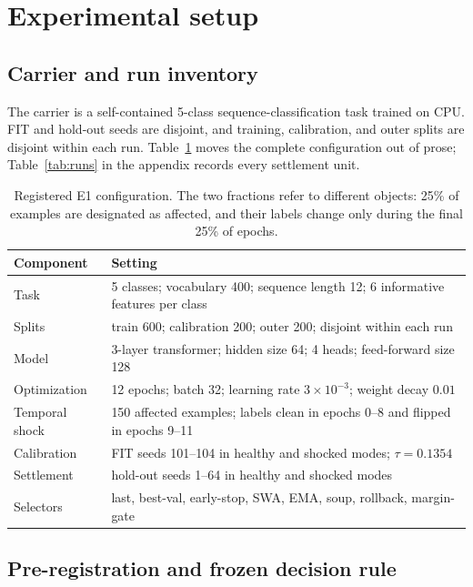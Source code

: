 \documentclass{article} %
\theoremstyle{remark}
\begin{document}
\section{Experimental setup}
\label{sec:exp}

\subsection{Carrier and run inventory}
\label{sec:configuration}

The carrier is a self-contained 5-class sequence-classification task trained on CPU. FIT and
hold-out seeds are disjoint, and training, calibration, and outer splits are disjoint within each
run. Table~\ref{tab:config} moves the complete configuration out of prose; Table~\ref{tab:runs} in
the appendix records every settlement unit.

\begin{table}[t]
\centering
\caption{Registered E1 configuration. The two fractions refer to different objects: 25\% of
examples are designated as affected, and their labels change only during the final 25\% of epochs.}
\label{tab:config}
\small
\begin{tabularx}{\linewidth}{@{}lX@{}}
\toprule
\textbf{Component} & \textbf{Setting} \\
\midrule
Task & 5 classes; vocabulary 400; sequence length 12; 6 informative features per class \\
Splits & train 600; calibration 200; outer 200; disjoint within each run \\
Model & 3-layer transformer; hidden size 64; 4 heads; feed-forward size 128 \\
Optimization & 12 epochs; batch 32; learning rate $3\times10^{-3}$; weight decay $0.01$ \\
Temporal shock & 150 affected examples; labels clean in epochs 0--8 and flipped in epochs 9--11 \\
Calibration & FIT seeds 101--104 in healthy and shocked modes; $\tau=0.1354$ \\
Settlement & hold-out seeds 1--64 in healthy and shocked modes \\
Selectors & last, best-val, early-stop, SWA, EMA, soup, rollback, margin-gate \\
\bottomrule
\end{tabularx}
\end{table}

\newpage
\subsection{Pre-registration and frozen decision rule}
\label{sec:prereg}
\end{document}

